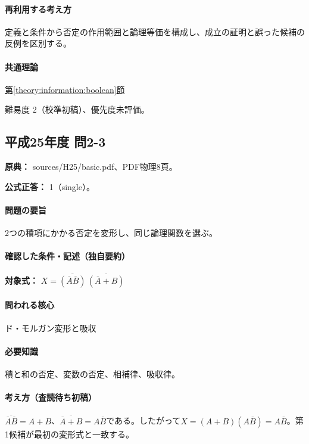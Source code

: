 \paragraph{再利用する考え方} 定義と条件から否定の作用範囲と論理等価を構成し、成立の証明と誤った候補の反例を区別する。

\paragraph{共通理論} \hyperref[theory:information:boolean]{第\ref*{theory:information:boolean}節}

\par 難易度 2（校準初稿）、優先度未評価。

\subsection{平成25年度 問2-3}
\label{q:h25-reg-basic-2-3}

\noindent\textbf{原典：} sources/H25/basic.pdf、PDF物理8頁。

\textbf{公式正答：} 1（single）。

\paragraph{問題の要旨} 2つの積項にかかる否定を変形し、同じ論理関数を選ぶ。

\paragraph{確認した条件・記述（独自要約）}\mbox{}\par

\noindent\textbf{対象式：} \(X=\overline{(\overline A\overline B)}\,\overline{(\overline A+B)}\)\par

\paragraph{問われる核心} ド・モルガン変形と吸収

\paragraph{必要知識} 積と和の否定、変数の否定、相補律、吸収律。

\paragraph{考え方（査読待ち初稿）} \(\overline{\overline A\overline B}=A+B\)、\(\overline{\overline A+B}=A\overline B\)である。したがって\(X=(A+B)(A\overline B)=A\overline B\)。第1候補が最初の変形式と一致する。

